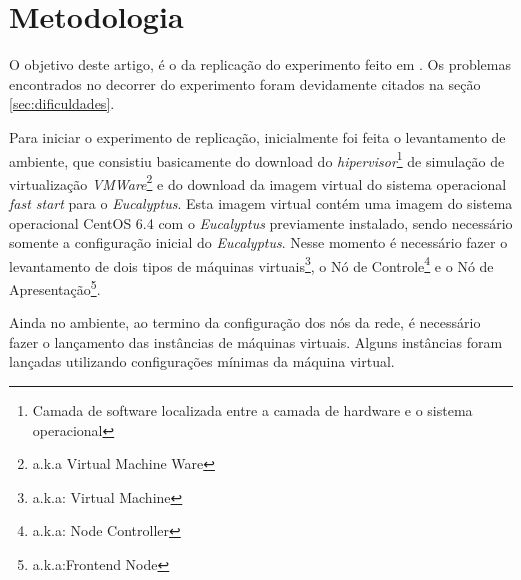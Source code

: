 \section{Metodologia}

O objetivo deste artigo, é o da replicação do experimento feito em \cite{elaine_et_al:14}. Os problemas encontrados no decorrer do experimento foram devidamente citados na seção \ref{sec:dificuldades}.

Para iniciar o experimento de replicação, inicialmente foi feita o levantamento de ambiente, que consistiu basicamente do download do \textit{hipervisor}\footnote{Camada de software localizada entre a camada de hardware e o sistema operacional\cite{dev_midia}} de simulação de virtualização \textit{VMWare}\footnote{a.k.a Virtual Machine Ware} e do download da imagem virtual do sistema operacional \textit{fast start} para o \textit{Eucalyptus}. Esta imagem virtual contém uma imagem do sistema operacional CentOS 6.4 com o \textit{Eucalyptus} previamente instalado, sendo necessário somente a configuração inicial do \textit{Eucalyptus}. Nesse momento é necessário fazer o levantamento de dois tipos de máquinas virtuais\footnote{a.k.a: Virtual Machine}, o Nó de Controle\footnote{a.k.a: Node Controller} e o Nó de Apresentação\footnote{a.k.a:Frontend Node}.

Ainda no ambiente, ao termino da configuração dos nós da rede, é necessário fazer o lançamento das instâncias de máquinas virtuais. Alguns instâncias foram lançadas utilizando configurações mínimas da máquina virtual.
